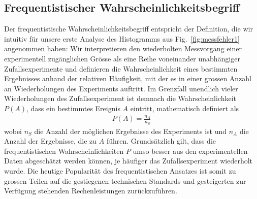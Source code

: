 
\subsection{Frequentistischer Wahrscheinlichkeitsbegriff}

Der frequentistische Wahrscheinlichkeitsbegriff entspricht der Definition, die wir intuitiv für unsere erste Analyse des Histogramms aus Fig.~\ref{fig:messfehler1} angenommen haben: Wir interpretieren den wiederholten Messvorgang einer experimentell zugänglichen Grösse als eine Reihe voneinander unabhängiger Zufallsexperimente und definieren die Wahrscheinlichkeit eines bestimmten Ergebnisses anhand der relativen Häufigkeit, mit der es in einer grossen Anzahl an Wiederholungen des Experiments auftritt. Im Grenzfall unendlich vieler Wiederholungen des Zufallsexperiment ist demnach die Wahrscheinlichkeit $P(A)$, dass ein bestimmtes Ereignis $A$ eintritt, mathematisch definiert als 
\begin{align}
P(A) = \frac{n_A}{n_S}\,
\label{eq:vl4-1}
\end{align}
wobei $n_S$ die Anzahl der möglichen Ergebnisse des Experiments ist und $n_A$ die Anzahl der Ergebnisse, die zu $A$ führen. Grundsätzlich gilt, dass die frequentistischen Wahrscheinlichkeiten $P$ umso besser aus den experimentellen Daten abgeschätzt werden können, je häufiger das Zufallsexperiment wiederholt wurde. Die heutige Popularität des frequentistischen Ansatzes ist somit zu grossen Teilen auf die gestiegenen technischen Standards und gesteigerten zur Verfügung stehenden Rechenleistungen zurückzuführen.  \\

